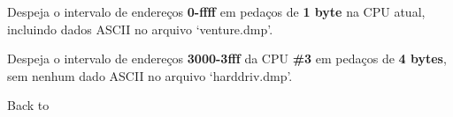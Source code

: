 \documentclass[letterpaper,10pt,brazil]{sphinxmanual}
\begin{document}
\begin{DUlineblock}{0em}
\item[]
\begin{DUlineblock}{\DUlineblockindent}
\item[] 
\item[] 
\end{DUlineblock}
\item[] Despeja o intervalo de endereços \textbf{0-ffff} em pedaços de \textbf{1 byte} na CPU atual, incluindo dados ASCII no arquivo `venture.dmp'.
\item[] 
\item[]
\begin{DUlineblock}{\DUlineblockindent}
\item[] 
\item[] 
\end{DUlineblock}
\item[] Despeja o intervalo de endereços \textbf{3000-3fff} da CPU \textbf{\#3} em pedaços de \textbf{4 bytes}, sem nenhum dado ASCII no arquivo `harddriv.dmp'.
\item[] 
\item[] Back to {\hyperref[debugger/memory:debugger\string-memory\string-list]{}}
\end{DUlineblock}
\begin{quote}
\label{debugger/memory:debugger-command-save}\end{quote}
\end{document}
